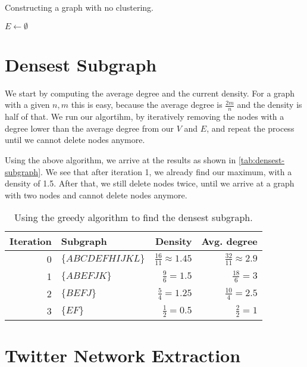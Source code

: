 \documentclass[a4paper,10pt,hidelinks]{article}
\begin{document}
\begin{algorithm}
\caption{Constructing a graph with no clustering.}
\label{algo:algo-no-clustering}

\begin{algorithmic}
    \State $E \gets \emptyset$
\end{algorithmic}

\end{algorithm}

\section{Densest Subgraph}

We start by computing the average degree and the current density. For a graph with a given $n, m$ this is easy, because the average degree is $\frac{2m}{n}$ and the density is half of that. We run our algortihm, by iteratively removing the nodes with a degree lower than the average degree from our $V$ and $E$, and repeat the process until we cannot delete nodes anymore.

Using the above algorithm, we arrive at the results as shown in \autoref{tab:densest-subgraph}. We see that after iteration 1, we already find our maximum, with a density of 1.5. After that, we still delete nodes twice, until we arrive at a graph with two nodes and cannot delete nodes anymore.

\begin{table}
    \centering
    \begin{tabular}{r || l | r | r}
        Iteration & Subgraph & Density & Avg. degree\\
        \hline
        0   & $\{A B C D E F H I J K L\}$ & $\frac{16}{11} \approx 1.45 $ & $\frac{32}{11} \approx 2.9 $ \\
        1   & $\{A B E F J K\}$ & $ \frac{9}{6} = 1.5 $ & $ \frac{18}{6} = 3 $ \\
        2   & $\{B E F J\}$ & $\frac{5}{4} = 1.25$ & $\frac{10}{4} = 2.5$ \\
        3   & $\{E F\}$ & $\frac{1}{2} = 0.5$ & $\frac{2}{2} = 1$
    \end{tabular}
    \caption{Using the greedy algorithm to find the densest subgraph.}
    \label{tab:densest-subgraph}
\end{table}

\section{Twitter Network Extraction}
\end{document}
